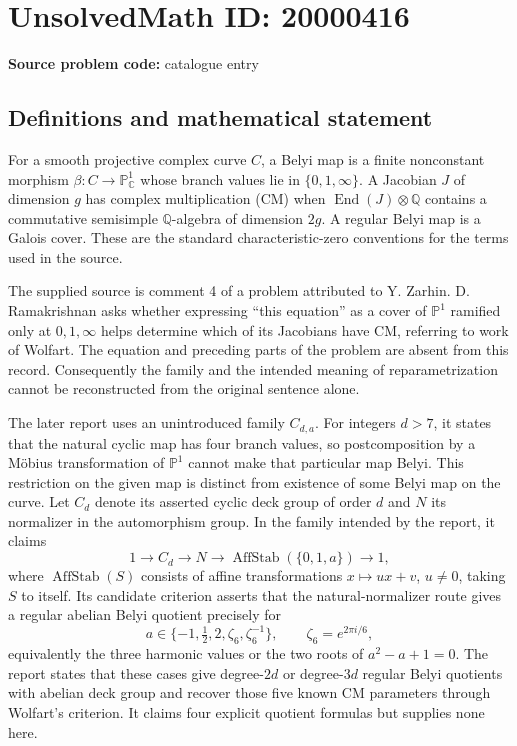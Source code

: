 \documentclass[11pt]{article}
\newcommand{\Q}{\mathbb{Q}}
\newcommand{\C}{\mathbb{C}}
\newcommand{\PP}{\mathbb{P}}
\begin{document}
\section*{UnsolvedMath ID: 20000416}
\textbf{Source problem code:} catalogue entry
\subsection{Definitions and mathematical statement}
For a smooth projective complex curve \(C\), a Belyi map is a finite nonconstant morphism \(\beta:C\to\PP^1_{\C}\) whose branch values lie in \(\{0,1,\infty\}\). A Jacobian \(J\) of dimension \(g\) has complex multiplication (CM) when \(\operatorname{End}(J)\otimes\Q\) contains a commutative semisimple \(\Q\)-algebra of dimension \(2g\). A regular Belyi map is a Galois cover. These are the standard characteristic-zero conventions for the terms used in the source.

The supplied source is comment 4 of a problem attributed to Y. Zarhin. D. Ramakrishnan asks whether expressing ``this equation'' as a cover of \(\PP^1\) ramified only at \(0,1,\infty\) helps determine which of its Jacobians have CM, referring to work of Wolfart. The equation and preceding parts of the problem are absent from this record. Consequently the family and the intended meaning of reparametrization cannot be reconstructed from the original sentence alone.

The later report uses an unintroduced family \(C_{d,a}\). For integers \(d>7\), it states that the natural cyclic map has four branch values, so postcomposition by a M\"obius transformation of \(\PP^1\) cannot make that particular map Belyi. This restriction on the given map is distinct from existence of some Belyi map on the curve. Let \(C_d\) denote its asserted cyclic deck group of order \(d\) and \(N\) its normalizer in the automorphism group. In the family intended by the report, it claims
\[
 1\longrightarrow C_d\longrightarrow N\longrightarrow
 \operatorname{AffStab}(\{0,1,a\})\longrightarrow1,
\]
where \(\operatorname{AffStab}(S)\) consists of affine transformations \(x\mapsto ux+v\), \(u\ne0\), taking \(S\) to itself. Its candidate criterion asserts that the natural-normalizer route gives a regular abelian Belyi quotient precisely for
\[
 a\in\{-1,\tfrac12,2,\zeta_6,\zeta_6^{-1}\},\qquad
 \zeta_6=e^{2\pi i/6},
\]
equivalently the three harmonic values or the two roots of \(a^2-a+1=0\). The report states that these cases give degree-\(2d\) or degree-\(3d\) regular Belyi quotients with abelian deck group and recover those five known CM parameters through Wolfart's criterion. It claims four explicit quotient formulas but supplies none here.
\end{document}
